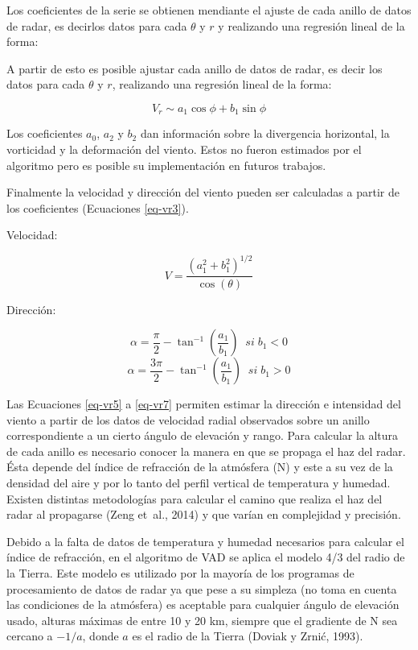 \documentclass[12pt,spanish,oneside, a4paper]{book}
\begin{document}
Los coeficientes de la serie se obtienen mendiante el ajuste de cada
anillo de datos de radar, es decirlos datos para cada \(\theta\) y \(r\)
y realizando una regresión lineal de la forma:

A partir de esto es posible ajustar cada anillo de datos de radar, es
decir los datos para cada \(\theta\) y \(r\), realizando una regresión
lineal de la forma:

\begin{equation}
\label{eq-vr4}
V_r \sim a_1\cos \phi + b_1 \sin \phi
\end{equation}

Los coeficientes \(a_0\), \(a_2\) y \(b_2\) dan información sobre la
divergencia horizontal, la vorticidad y la deformación del viento. Estos
no fueron estimados por el algoritmo pero es posible su implementación
en futuros trabajos.

Finalmente la velocidad y dirección del viento pueden ser calculadas a
partir de los coeficientes (Ecuaciones \ref{eq-vr3}).

Velocidad:

\begin{equation}
\label{eq-vr5}
V = \frac{(a_{1}^{2} + b_{1}^{2})^{1/2}}{\cos(\theta)}
\end{equation}

Dirección:

\begin{equation}\label{eq-vr6}
\alpha = \frac{\pi}{2}-\tan^{-1}(\frac{a_1}{b_1}) \; \; si \; b_1 < 0 
\end{equation}\begin{equation}\label{eq-vr7}
\alpha = \frac{3\pi}{2}-\tan^{-1}(\frac{a_1}{b_1}) \; \; si \; b_1 > 0
\end{equation}

Las Ecuaciones \ref{eq-vr5} a \ref{eq-vr7} permiten estimar la dirección
e intensidad del viento a partir de los datos de velocidad radial
observados sobre un anillo correspondiente a un cierto ángulo de
elevación y rango. Para calcular la altura de cada anillo es necesario
conocer la manera en que se propaga el haz del radar. Ésta depende del
índice de refracción de la atmósfera (N) y este a su vez de la densidad
del aire y por lo tanto del perfil vertical de temperatura y humedad.
Existen distintas metodologías para calcular el camino que realiza el
haz del radar al propagarse (Zeng et~al., 2014) y que varían en
complejidad y precisión.

Debido a la falta de datos de temperatura y humedad necesarios para
calcular el índice de refracción, en el algoritmo de VAD se aplica el
modelo 4/3 del radio de la Tierra. Este modelo es utilizado por la
mayoría de los programas de procesamiento de datos de radar ya que pese
a su simpleza (no toma en cuenta las condiciones de la atmósfera) es
aceptable para cualquier ángulo de elevación usado, alturas máximas de
entre 10 y 20 km, siempre que el gradiente de N sea cercano a \(-1/a\),
donde \(a\) es el radio de la Tierra (Doviak y Zrnić, 1993).
\end{document}
